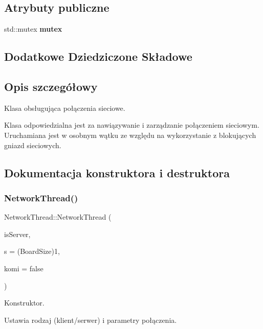 \subsection*{Atrybuty publiczne}
\begin{DoxyCompactItemize}
\item 
std\+::mutex \textbf{ mutex}
\end{DoxyCompactItemize}
\subsection*{Dodatkowe Dziedziczone Składowe}


\subsection{Opis szczegółowy}
Klasa obsługująca połączenia sieciowe. 

Klasa odpowiedzialna jest za nawiązywanie i zarządzanie połączeniem sieciowym. Uruchamiana jest w osobnym wątku ze względu na wykorzystanie z blokujących gniazd sieciowych. 

\subsection{Dokumentacja konstruktora i destruktora}
\mbox{\label{class_network_thread_a970f52c02f610d34d9b7d1c80b7eb477}} 
\subsubsection{NetworkThread()}
{\footnotesize\ttfamily Network\+Thread\+::\+Network\+Thread (\begin{DoxyParamCaption}\item[{bool}]{is\+Server,  }\item[{Board\+Size}]{s = {\ttfamily (BoardSize)1},  }\item[{bool}]{komi = {\ttfamily false} }\end{DoxyParamCaption})}



Konstruktor. 

Ustawia rodzaj (klient/serwer) i parametry połączenia. \mbox{\label{class_network_thread_adaed788a9be6fbb4ed1aef9905e3e18f}} 
